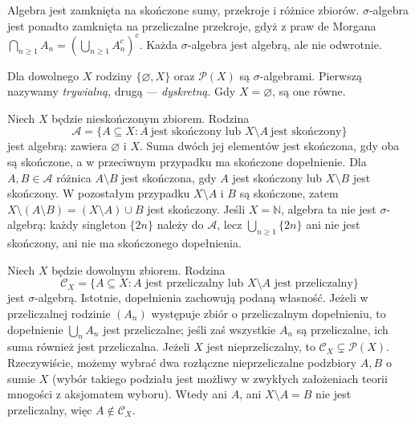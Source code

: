 \begin{uwaga}
Algebra jest zamknięta na skończone sumy, przekroje i różnice zbiorów.
$\sigma$-algebra jest ponadto zamknięta na przeliczalne przekroje, gdyż
z praw de Morgana
$\bigcap_{n\geq1}A_n=(\bigcup_{n\geq1}A_n^c)^c$.
Każda $\sigma$-algebra jest algebrą, ale nie odwrotnie.
\end{uwaga}

\begin{przyklad}
Dla dowolnego $X$ rodziny $\{\varnothing,X\}$ oraz $\mathcal P(X)$ są
$\sigma$-algebrami. Pierwszą nazywamy \emph{trywialną}, drugą ---
\emph{dyskretną}. Gdy $X=\varnothing$, są one równe.
\end{przyklad}

\begin{przyklad}
\label{ex:finite-cofinite}
Niech $X$ będzie nieskończonym zbiorem. Rodzina
\[
\mathcal A=\{A\subseteq X:A\ \text{jest skończony lub }X\setminus A
\ \text{jest skończony}\}
\]
jest algebrą: zawiera $\varnothing$ i $X$. Suma dwóch jej elementów
jest skończona, gdy oba są skończone, a w przeciwnym przypadku
ma skończone dopełnienie. Dla $A,B\in\mathcal A$ różnica
$A\setminus B$ jest skończona, gdy $A$ jest skończony lub
$X\setminus B$ jest skończony. W pozostałym przypadku
$X\setminus A$ i $B$ są skończone, zatem
$X\setminus(A\setminus B)=(X\setminus A)\cup B$
jest skończony. Jeśli $X=\mathbb N$, algebra ta nie jest
$\sigma$-algebrą:
każdy singleton $\{2n\}$ należy do $\mathcal A$, lecz
$\bigcup_{n\geq1}\{2n\}$ ani nie jest skończony, ani nie ma skończonego
dopełnienia.
\end{przyklad}

\begin{przyklad}
\label{ex:countable-cocountable}
Niech $X$ będzie dowolnym zbiorem. Rodzina
\[
\mathcal C_X=\{A\subseteq X:A\text{ jest przeliczalny lub }X\setminus A
\text{ jest przeliczalny}\}
\]
jest $\sigma$-algebrą. Istotnie, dopełnienia zachowują podaną własność.
Jeżeli w przeliczalnej rodzinie $(A_n)$ występuje zbiór o przeliczalnym
dopełnieniu, to dopełnienie $\bigcup_nA_n$ jest przeliczalne; jeśli zaś
wszystkie $A_n$ są przeliczalne, ich suma również jest przeliczalna.
Jeżeli $X$ jest nieprzeliczalny, to $\mathcal C_X\subsetneq\mathcal P(X)$.
Rzeczywiście, możemy wybrać dwa rozłączne nieprzeliczalne podzbiory
$A,B$ o sumie $X$ (wybór takiego podziału jest możliwy w zwykłych
założeniach teorii mnogości z aksjomatem wyboru). Wtedy ani $A$,
ani $X\setminus A=B$ nie jest przeliczalny, więc
$A\notin\mathcal C_X$.
\end{przyklad}

